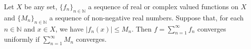 \documentclass[12pt]{article}
\newcommand{\N}{\mathbb{N}}
\begin{document}
Let $X$ be any set, $\{f_n\}_{n\in\N}$ a sequence of real or complex valued functions on $X$ and $\{M_n\}_{n\in\N}$ a sequence of non-negative real numbers.
Suppose that, for each $n \in \N$ and $x \in X$, we have
$|f_n(x)| \le M_n$. Then $f=\sum_{n=1}^{\infty} f_n$ converges uniformly if
$\sum_{n=1}^{\infty} M_n$ converges.
\end{document}
